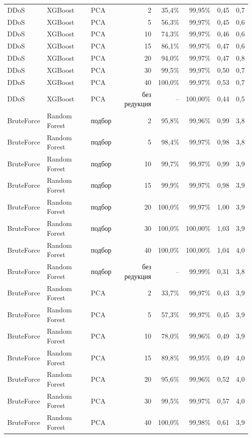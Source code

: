{\begin{tabular}{@{}lllrrrrr@{}}
DDoS & XGBoost & PCA & 2 & 35,4\% & 99,95\% & 0,45 & 0,7\\
\rowcolor{rowalt}DDoS & XGBoost & PCA & 5 & 56,3\% & 99,97\% & 0,45 & 0,6\\
DDoS & XGBoost & PCA & 10 & 74,3\% & 99,97\% & 0,46 & 0,6\\
\rowcolor{rowalt}DDoS & XGBoost & PCA & 15 & 86,1\% & 99,97\% & 0,47 & 0,6\\
DDoS & XGBoost & PCA & 20 & 94,0\% & 99,97\% & 0,47 & 0,8\\
\rowcolor{rowalt}DDoS & XGBoost & PCA & 30 & 99,5\% & 99,97\% & 0,50 & 0,7\\
DDoS & XGBoost & PCA & 40 & 100,0\% & 99,97\% & 0,53 & 0,7\\
\rowcolor{rowalt}DDoS & XGBoost & PCA & без редукция & -- & 100,00\% & 0,44 & 0,5\\
BruteForce & Random Forest & подбор & 2 & 95,8\% & 99,96\% & 0,99 & 3,8\\
\rowcolor{rowalt}BruteForce & Random Forest & подбор & 5 & 98,4\% & 99,97\% & 0,98 & 3,8\\
BruteForce & Random Forest & подбор & 10 & 99,7\% & 99,97\% & 0,99 & 3,9\\
\rowcolor{rowalt}BruteForce & Random Forest & подбор & 15 & 99,9\% & 99,97\% & 0,98 & 3,9\\
BruteForce & Random Forest & подбор & 20 & 100,0\% & 99,97\% & 1,00 & 3,9\\
\rowcolor{rowalt}BruteForce & Random Forest & подбор & 30 & 100,0\% & 100,00\% & 1,03 & 3,9\\
BruteForce & Random Forest & подбор & 40 & 100,0\% & 100,00\% & 1,04 & 4,0\\
\rowcolor{rowalt}BruteForce & Random Forest & подбор & без редукция & -- & 99,99\% & 0,31 & 3,8\\
BruteForce & Random Forest & PCA & 2 & 33,7\% & 99,97\% & 0,43 & 3,9\\
\rowcolor{rowalt}BruteForce & Random Forest & PCA & 5 & 57,3\% & 99,97\% & 0,45 & 3,9\\
BruteForce & Random Forest & PCA & 10 & 78,0\% & 99,96\% & 0,49 & 3,9\\
\rowcolor{rowalt}BruteForce & Random Forest & PCA & 15 & 89,8\% & 99,95\% & 0,49 & 4,0\\
BruteForce & Random Forest & PCA & 20 & 95,6\% & 99,96\% & 0,52 & 4,0\\
\rowcolor{rowalt}BruteForce & Random Forest & PCA & 30 & 99,5\% & 99,97\% & 0,57 & 4,0\\
BruteForce & Random Forest & PCA & 40 & 100,0\% & 99,98\% & 0,61 & 3,9\\

\end{tabular}}
